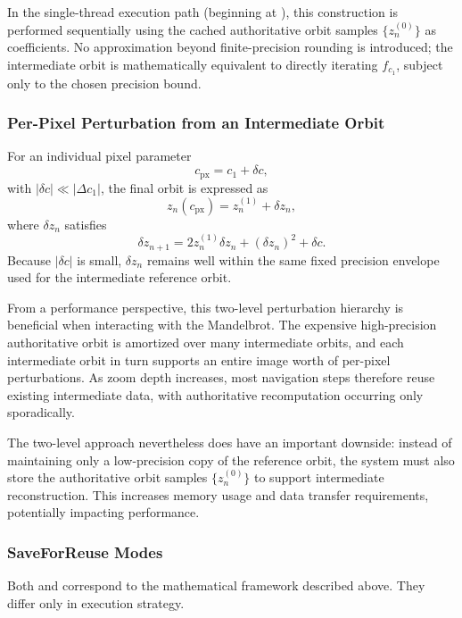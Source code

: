 In the single-thread execution path (beginning at
), this construction is performed
sequentially using the cached authoritative
orbit samples $\{z^{(0)}_n\}$ as coefficients.
No approximation beyond finite-precision rounding is introduced; the intermediate orbit is mathematically equivalent
to directly iterating $f_{c_1}$, subject only to the chosen precision bound.

\subsubsection{Per-Pixel Perturbation from an Intermediate Orbit}

For an individual pixel parameter
\[
c_{\text{px}} = c_1 + \delta c,
\]
with $|\delta c| \ll |\Delta c_1|$, the final orbit is expressed as
\[
z_n(c_{\text{px}}) = z^{(1)}_n + \delta z_n,
\]
where $\delta z_n$ satisfies
\begin{equation}
\delta z_{n+1}
= 2 z^{(1)}_n \delta z_n
  + (\delta z_n)^2
  + \delta c.
\label{eq:pixel_perturbation}
\end{equation}
Because $|\delta c|$ is small, $\delta z_n$ remains well within the same fixed precision envelope used for the
intermediate reference orbit.

From a performance perspective, this two-level perturbation hierarchy is
beneficial when interacting with the Mandelbrot. The expensive high-precision
authoritative orbit is amortized over many intermediate orbits, and each
intermediate orbit in turn supports an entire image worth of per-pixel
perturbations. As zoom depth increases, most navigation steps therefore reuse
existing intermediate data, with authoritative recomputation occurring only
sporadically.

The two-level approach nevertheless does have an important downside: instead of
maintaining only a low-precision copy of the reference orbit, the system must also
store the authoritative orbit samples $\{z^{(0)}_n\}$ to support intermediate
reconstruction.  This increases memory usage and data transfer requirements,
potentially impacting performance.

\subsubsection{SaveForReuse Modes}

Both  and  correspond to the mathematical framework described above.
They differ only in execution strategy.

